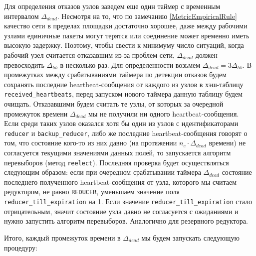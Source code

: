 \documentclass{article}
\theoremstyle{plain}
\theoremstyle{plain}
\theoremstyle{plain}
\theoremstyle{plain}
\theoremstyle{definition}
\theoremstyle{remark}
\theoremstyle{plain}
\begin{document}
Для определения отказов узлов заведем еще один таймер с временным интервалом $\Delta_{dead}$. Несмотря на то, что по замечанию \ref{MetricEmpiricalRule} качество сети в пределах площадки достаточно хорошее, даже между рабочими узлами единичные пакеты могут терятся или соединение может временно иметь высокую задержку. Поэтому, чтобы свести к минимуму число ситуаций, когда рабочий узел считается отказавшим из-за проблем сети, $\Delta_{dead}$ должен превосходить $\Delta_{hb}$ в несколько раз. Для определенности возьмем $\Delta_{dead} = 3\Delta_{hb}$. В промежутках между срабатываниями таймера по детекции отказов будем сохранять последние heartbeat-сообщения от каждого из узлов в хэш-таблицу \texttt{re\-cei\-ved\_heart\-beats}, перед запуском нового таймера данную таблицу будем очищать. Отказавшими будем считать те узлы, от которых за очередной промежуток времени $\Delta_{dead}$ мы не получили ни одного heartbeat-сообщения. Если среди таких узлов оказался хотя бы один из узлов с идентификаторами \texttt{reducer} и \texttt{backup\_reducer}, либо же последние heartbeat-сообщения говорят о том, что состояние кого-то из них давно (на протяжении $n_e \cdot \Delta_{dead}$ времени) не согласуется текущими значениями данных полей, то запускается алгоритм перевыборов (метод \texttt{reelect}). Последняя проверка будет осуществляться следующим образом: если при очередном срабатывании таймера $\Delta_{dead}$ состояние последнего полученного heartbeat-сообщения от узла, которого мы считаем редуктором, не равно \texttt{REDUCER}, уменьшаем значение поля \texttt{reducer\_till\_expiration} на 1. Если значение \texttt{reducer\_till\_expiration} стало отрицательным, значит состояние узла давно не согласуется с ожиданиями и нужно запустить алгоритм перевыборов. Аналогично для резервного редуктора.

Итого, каждый промежуток времени в $\Delta_{dead}$ мы будем запускать следующую процедуру:
\end{document}
